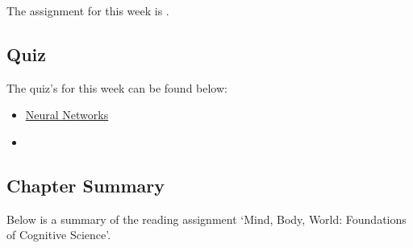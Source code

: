 The assignment for this week is .  

\subsection{Quiz}

The quiz's for this week can be found below:

\begin{itemize}
    \item \href{https://applied.cs.colorado.edu/mod/quiz/view.php?id=49399}{Neural Networks}  
    \item {}
\end{itemize}

\subsection{Chapter Summary}

Below is a summary of the reading assignment `Mind, Body, World: Foundations of Cognitive Science'.

